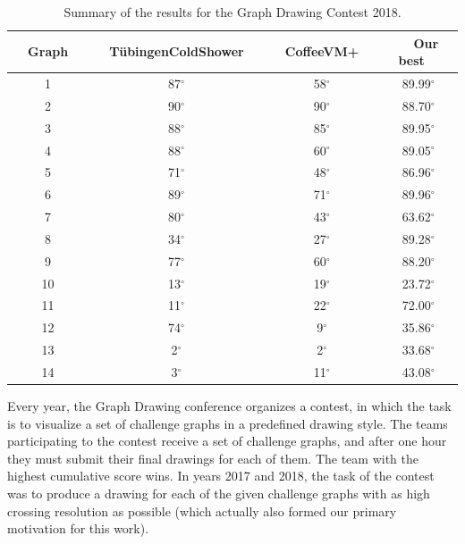 \documentclass{comjnl}
\begin{document}
\begin{table}
\caption{Summary of the results for the Graph Drawing Contest 2018.}
\centering
\begin{tabular}{c|c|c|c}
\toprule
\rowcolor{gray!30!} ~~Graph~~ & ~~T\"ubingenColdShower~~ & ~~CoffeeVM+~~ & ~~Our best~~ \\
\midrule
\rowcolor{gray!30!} 1  & 87$^\circ$ & 58$^\circ$ & 89.99$^\circ$\\
\rowcolor{gray!00!} 2  & 90$^\circ$ & 90$^\circ$ & 88.70$^\circ$\\
\rowcolor{gray!30!} 3  & 88$^\circ$ & 85$^\circ$ & 89.95$^\circ$\\
\rowcolor{gray!00!} 4  & 88$^\circ$ & 60$^\circ$ & 89.05$^\circ$\\
\rowcolor{gray!30!} 5  & 71$^\circ$ & 48$^\circ$ & 86.96$^\circ$\\
\rowcolor{gray!00!} 6  & 89$^\circ$ & 71$^\circ$ & 89.96$^\circ$\\
\rowcolor{gray!30!} 7  & 80$^\circ$ & 43$^\circ$ & 63.62$^\circ$\\
\rowcolor{gray!00!} 8  & 34$^\circ$ & 27$^\circ$ & 89.28$^\circ$\\
\rowcolor{gray!30!} 9  & 77$^\circ$ & 60$^\circ$ & 88.20$^\circ$\\
\rowcolor{gray!00!} 10 & 13$^\circ$ & 19$^\circ$ & 23.72$^\circ$\\
\rowcolor{gray!30!} 11 & 11$^\circ$ & 22$^\circ$ & 72.00$^\circ$\\
\rowcolor{gray!00!} 12 & 74$^\circ$ &  9$^\circ$ & 35.86$^\circ$\\
\rowcolor{gray!30!} 13 &  2$^\circ$ &  2$^\circ$ & 33.68$^\circ$\\
\rowcolor{gray!00!} 14 &  3$^\circ$ & 11$^\circ$ & 43.08$^\circ$\\
\bottomrule
\end{tabular}
\label{tab:gdContest2018}
\end{table}

Every year, the Graph Drawing conference organizes a contest, in which the task is to visualize a set of challenge graphs in a predefined drawing style. The teams participating to the contest receive a set of challenge graphs, and after one hour they must submit their final drawings for each of them. The team with the highest cumulative score wins. In years 2017 and 2018, the task of the contest was to produce a drawing for each of the given challenge graphs with as high crossing resolution as possible (which actually also formed our primary motivation for this work). 
\end{document}
